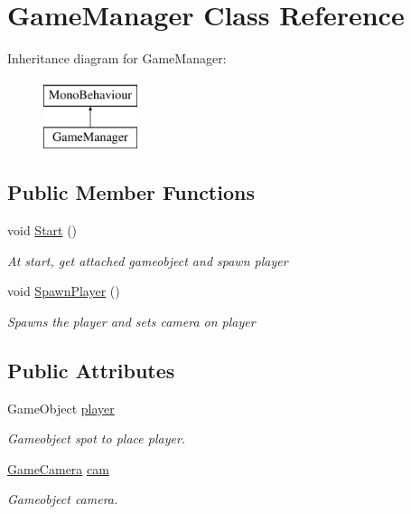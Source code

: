 \hypertarget{classGameManager}{\section{Game\-Manager Class Reference}
\label{classGameManager}
}
Inheritance diagram for Game\-Manager\-:\begin{figure}[H]
\begin{center}
\leavevmode
\includegraphics[height=2.000000cm]{classGameManager}
\end{center}
\end{figure}
\subsection*{Public Member Functions}
\begin{DoxyCompactItemize}
\item 
void \hyperlink{classGameManager_a5ccfacd027ad08eeb4ff1f25a7f59c98}{Start} ()
\begin{DoxyCompactList}\small\item\em At start, get attached gameobject and spawn player \end{DoxyCompactList}\item 
void \hyperlink{classGameManager_a62960104332e06a3324eb2cc78ce4317}{Spawn\-Player} ()
\begin{DoxyCompactList}\small\item\em Spawns the player and sets camera on player \end{DoxyCompactList}\end{DoxyCompactItemize}
\subsection*{Public Attributes}
\begin{DoxyCompactItemize}
\item 
Game\-Object \hyperlink{classGameManager_abe8e79771775bc67c63c4ac43349dc8a}{player}
\begin{DoxyCompactList}\small\item\em Gameobject spot to place player. \end{DoxyCompactList}\item 
\hyperlink{classGameCamera}{Game\-Camera} \hyperlink{classGameManager_ad95999a7d419e9262f7f22fdad69df9d}{cam}
\begin{DoxyCompactList}\small\item\em Gameobject camera. \end{DoxyCompactList}\end{DoxyCompactItemize}


